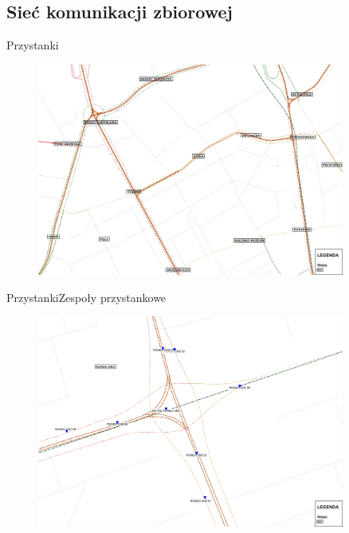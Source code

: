\documentclass[8pt]{beamer}
\begin{document}
\subsection{Sieć komunikacji zbiorowej}
\begin{frame}{Przystanki}
\begin{figure}
\begin{center}
\includegraphics[width=0.9\textwidth]{stops}
 \end{center}
  \end{figure} 
\end{frame}

\begin{frame}{Przystanki}{Zespoły przystankowe}
\begin{figure}\begin{center}
\includegraphics[width=0.9\textwidth]{stop_points}
 \end{center}  \end{figure} 
\end{frame}
\end{document}
